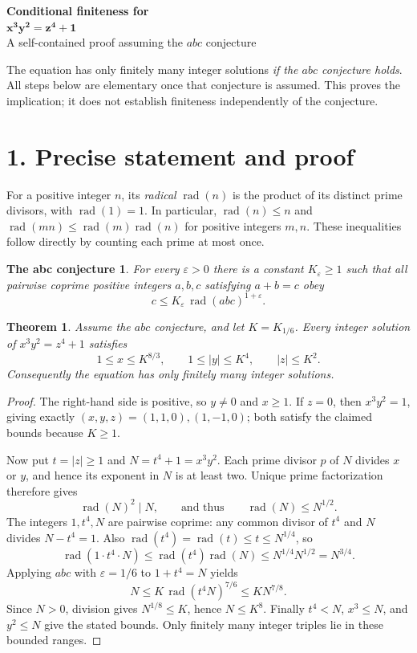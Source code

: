 \documentclass[11pt,a4paper]{article}
\DeclareMathOperator{\rad}{rad}
\newtheorem{theorem}{Theorem}
\newtheorem*{conjecture}{The abc conjecture}
\begin{document}
\begin{center}
{\LARGE\bfseries Conditional finiteness for}\\[6pt]
{\Large $\boldsymbol{x^3y^2=z^4+1}$}\\[7pt]
{\small A self-contained proof assuming the $abc$ conjecture}
\end{center}

The equation has only finitely many integer solutions \emph{if the
$abc$ conjecture holds}. All steps below are elementary once that conjecture
is assumed. This proves the implication; it does not establish finiteness
independently of the conjecture.

\section*{1. Precise statement and proof}
For a positive integer $n$, its \emph{radical} $\rad(n)$ is the product of
its distinct prime divisors, with $\rad(1)=1$. In particular,
$\rad(n)\le n$ and $\rad(mn)\le\rad(m)\rad(n)$ for positive integers $m,n$.
These inequalities follow directly by counting each prime at most once.

\begin{conjecture}
For every $\varepsilon>0$ there is a constant $K_\varepsilon\ge1$ such that
all pairwise coprime positive integers $a,b,c$ satisfying $a+b=c$ obey
\[
c\le K_\varepsilon\,\rad(abc)^{1+\varepsilon}.
\]
\end{conjecture}

\begin{theorem}
Assume the $abc$ conjecture, and let $K=K_{1/6}$. Every integer solution of
$x^3y^2=z^4+1$ satisfies
\[
1\le x\le K^{8/3},\qquad 1\le |y|\le K^4,\qquad |z|\le K^2.
\]
Consequently the equation has only finitely many integer solutions.
\end{theorem}

\begin{proof}
The right-hand side is positive, so $y\ne0$ and $x\ge1$. If $z=0$, then
$x^3y^2=1$, giving exactly $(x,y,z)=(1,1,0),(1,-1,0)$; both satisfy the
claimed bounds because $K\ge1$.

Now put $t=|z|\ge1$ and $N=t^4+1=x^3y^2$. Each prime divisor $p$ of $N$
divides $x$ or $y$, and hence its exponent in $N$ is at least two.
Unique prime factorization therefore gives
\begin{equation}
\rad(N)^2\mid N,\qquad\text{and thus}\qquad\rad(N)\le N^{1/2}.
\label{eq:squareful}
\end{equation}
The integers $1,t^4,N$ are pairwise coprime: any common divisor of $t^4$
and $N$ divides $N-t^4=1$. Also $\rad(t^4)=\rad(t)\le t\le N^{1/4}$, so
\begin{equation}
\rad(1\cdot t^4\cdot N)
\le\rad(t^4)\rad(N)\le N^{1/4}N^{1/2}=N^{3/4}.
\label{eq:radical}
\end{equation}
Applying $abc$ with $\varepsilon=1/6$ to $1+t^4=N$ yields
\[
N\le K\,\rad(t^4N)^{7/6}\le K N^{7/8}.
\]
Since $N>0$, division gives $N^{1/8}\le K$, hence $N\le K^8$.
Finally $t^4<N$, $x^3\le N$, and $y^2\le N$ give the stated bounds.
Only finitely many integer triples lie in these bounded ranges.
\end{proof}
\end{document}
